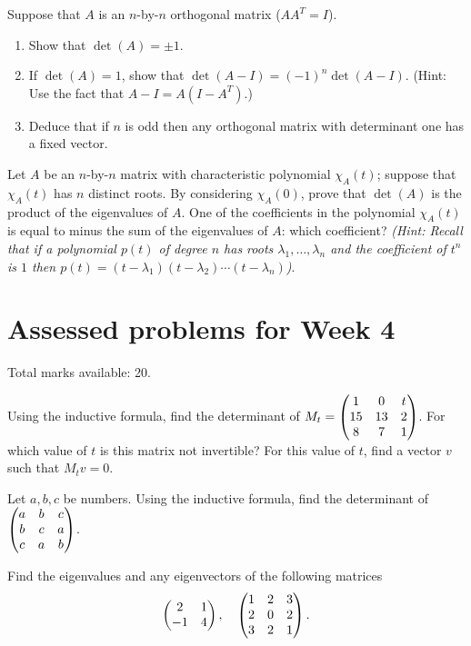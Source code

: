 \documentclass{article}
\begin{document}
\begin{Exercise}\label{exr:orthaxis}
Suppose that \(A\) is an \(n\)-by-\(n\) orthogonal matrix
(\(AA^T=I\)).
\begin{enumerate}
\item Show that \(\det(A)=\pm 1\).
\item If \(\det(A)=1\), show that \(\det(A-I)=(-1)^n\det(A-I)\). (Hint:
Use the fact that \(A-I=A(I-A^T)\).)
\item Deduce that if \(n\) is odd then any orthogonal matrix with
determinant one has a fixed vector.


\end{enumerate}
\end{Exercise}
\begin{Exercise}\label{exr:detprod}
Let \(A\) be an \(n\)-by-\(n\) matrix with characteristic polynomial
\(\chi_A(t)\); suppose that \(\chi_A(t)\) has \(n\) distinct
roots. By considering \(\chi_A(0)\), prove that \(\det(A)\) is the
product of the eigenvalues of \(A\). One of the coefficients in the
polynomial \(\chi_A(t)\) is equal to minus the sum of the
eigenvalues of \(A\): which coefficient? {\em (Hint: Recall that if
a polynomial \(p(t)\) of degree \(n\) has roots
\(\lambda_1,\ldots,\lambda_n\) and the coefficient of \(t^n\) is
\(1\) then \(p(t)=(t-\lambda_1)(t-\lambda_2)\cdots(t-\lambda_n)\))}.


\end{Exercise}
\setcounter{section}{3}
\section{Assessed problems for Week 4}


Total marks available: 20.


\begin{Question}
Using the inductive formula, find the determinant of \(M_t=\begin{pmatrix} 1 & 0
& t \\ 15 & 13 & 2 \\ 8 & 7 & 1\end{pmatrix}\). For which value of \(t\) is
this matrix not invertible?  For this value of \(t\), find a
vector \(v\) such that \(M_tv=0\).


\end{Question}
\begin{Question}
Let \(a,b,c\) be numbers. Using the inductive formula,  find
the determinant of \(\begin{pmatrix} a & b & c \\ b & c & a \\ c & a & b\end{pmatrix}\).


\end{Question}
\begin{Question}
Find the eigenvalues and any eigenvectors of the following matrices
 \[\begin{pmatrix} 2 & 1 \\ -1 & 4\end{pmatrix},\quad \begin{pmatrix} 1 & 2 & 3 \\ 2 & 0 & 2
\\ 3 & 2 & 1\end{pmatrix}.\]


\end{Question}
\end{document}
